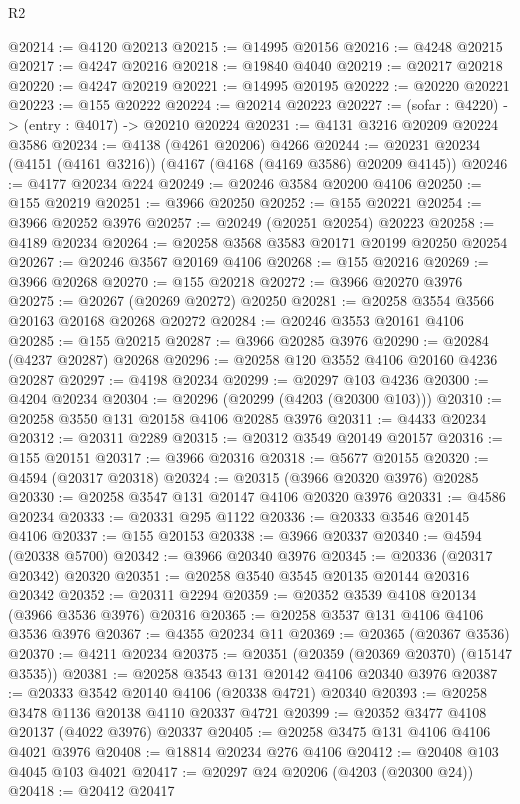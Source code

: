 \begin{lexlean}{R2}
\begin{coremodule}
@20214 := @4120 @20213
@20215 := @14995 @20156
@20216 := @4248 @20215
@20217 := @4247 @20216
@20218 := @19840 @4040
@20219 := @20217 @20218
@20220 := @4247 @20219
@20221 := @14995 @20195
@20222 := @20220 @20221
@20223 := @155 @20222
@20224 := @20214 @20223
@20227 := (sofar : @4220) -> (entry : @4017) -> @20210 @20224
@20231 := @4131 @3216 @20209 @20224 @3586
@20234 := @4138 (@4261 @20206) @4266
@20244 := @20231 @20234 (@4151 (@4161 @3216)) (@4167 (@4168 (@4169 @3586) @20209 @4145))
@20246 := @4177 @20234 @224
@20249 := @20246 @3584 @20200 @4106
@20250 := @155 @20219
@20251 := @3966 @20250
@20252 := @155 @20221
@20254 := @3966 @20252 @3976
@20257 := @20249 (@20251 @20254) @20223
@20258 := @4189 @20234
@20264 := @20258 @3568 @3583 @20171 @20199 @20250 @20254
@20267 := @20246 @3567 @20169 @4106
@20268 := @155 @20216
@20269 := @3966 @20268
@20270 := @155 @20218
@20272 := @3966 @20270 @3976
@20275 := @20267 (@20269 @20272) @20250
@20281 := @20258 @3554 @3566 @20163 @20168 @20268 @20272
@20284 := @20246 @3553 @20161 @4106
@20285 := @155 @20215
@20287 := @3966 @20285 @3976
@20290 := @20284 (@4237 @20287) @20268
@20296 := @20258 @120 @3552 @4106 @20160 @4236 @20287
@20297 := @4198 @20234
@20299 := @20297 @103 @4236
@20300 := @4204 @20234
@20304 := @20296 (@20299 (@4203 (@20300 @103)))
@20310 := @20258 @3550 @131 @20158 @4106 @20285 @3976
@20311 := @4433 @20234
@20312 := @20311 @2289
@20315 := @20312 @3549 @20149 @20157
@20316 := @155 @20151
@20317 := @3966 @20316
@20318 := @5677 @20155
@20320 := @4594 (@20317 @20318)
@20324 := @20315 (@3966 @20320 @3976) @20285
@20330 := @20258 @3547 @131 @20147 @4106 @20320 @3976
@20331 := @4586 @20234
@20333 := @20331 @295 @1122
@20336 := @20333 @3546 @20145 @4106
@20337 := @155 @20153
@20338 := @3966 @20337
@20340 := @4594 (@20338 @5700)
@20342 := @3966 @20340 @3976
@20345 := @20336 (@20317 @20342) @20320
@20351 := @20258 @3540 @3545 @20135 @20144 @20316 @20342
@20352 := @20311 @2294
@20359 := @20352 @3539 @4108 @20134 (@3966 @3536 @3976) @20316
@20365 := @20258 @3537 @131 @4106 @4106 @3536 @3976
@20367 := @4355 @20234 @11
@20369 := @20365 (@20367 @3536)
@20370 := @4211 @20234
@20375 := @20351 (@20359 (@20369 @20370) (@15147 @3535))
@20381 := @20258 @3543 @131 @20142 @4106 @20340 @3976
@20387 := @20333 @3542 @20140 @4106 (@20338 @4721) @20340
@20393 := @20258 @3478 @1136 @20138 @4110 @20337 @4721
@20399 := @20352 @3477 @4108 @20137 (@4022 @3976) @20337
@20405 := @20258 @3475 @131 @4106 @4106 @4021 @3976
@20408 := @18814 @20234 @276 @4106
@20412 := @20408 @103 @4045 @103 @4021
@20417 := @20297 @24 @20206 (@4203 (@20300 @24))
@20418 := @20412 @20417

\end{coremodule}
\end{lexlean}
